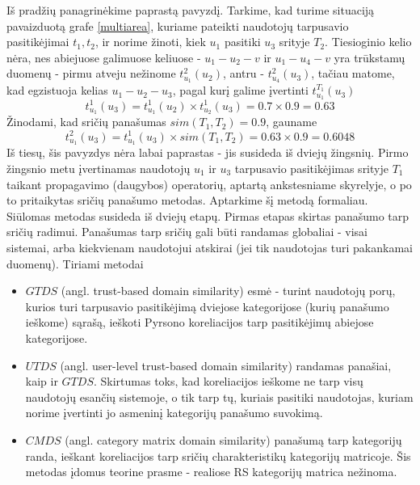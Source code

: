 \documentclass{VUMIFInfMagistrinis}
\begin{document}
\indent
Iš pradžių panagrinėkime paprastą pavyzdį. Tarkime, kad turime situaciją pavaizduotą grafe \ref{multiarea}, kuriame pateikti naudotojų tarpusavio pasitikėjimai ${t_1, t_2}$, ir norime žinoti, kiek $u_1$ pasitiki $u_3$ srityje $T_2$. Tiesioginio kelio nėra, nes abiejuose galimuose keliuose - $u_1 - u_2 - v$ ir $u_1 - u_4 - v$ yra trūkstamų duomenų - pirmu atveju nežinome $t_{u_1}^2(u_2)$, antru - $t_{u_4}^2(u_3)$, tačiau matome, kad egzistuoja kelias $u_1 - u_2 - u_3$, pagal kurį galime įvertinti $t_{u_1}^{T_1}(u_3)$
\begin{displaymath}
t_{u_1}^1(u_3)=t_{u_1}^1(u_2) \times t_{u_2}^1(u_3) = 0.7 \times 0.9 = 0.63
\end{displaymath}
Žinodami, kad sričių panašumas $sim(T_1, T_2) = 0.9$, gauname
\begin{displaymath}
t_{u_1}^2(u_3)=t_{u_1}^1(u_3) \times sim(T_1, T_2) = 0.63 \times 0.9 = 0.6048
\end{displaymath}
\indent 
Iš tiesų, šis pavyzdys nėra labai paprastas - jis susideda iš dviejų žingsnių. Pirmo žingsnio metu įvertinamas naudotojų $u_1$ ir $u_3$ tarpusavio pasitikėjimas srityje $T_1$ taikant propagavimo (daugybos) operatorių, aptartą ankstesniame skyrelyje, o po to pritaikytas sričių panašumo metodas. Aptarkime šį metodą formaliau.
\newline
\indent
Siūlomas metodas susideda iš dviejų etapų. Pirmas etapas skirtas panašumo tarp sričių radimui. Panašumas tarp sričių gali būti randamas globaliai - visai sistemai, arba kiekvienam naudotojui atskirai (jei tik naudotojas turi pakankamai duomenų). Tiriami metodai
\begin{itemize}
	\item $GTDS$ (angl. trust-based domain similarity) esmė - turint naudotojų porų, kurios turi tarpusavio pasitikėjimą dviejose kategorijose (kurių panašumo ieškome) sąrašą, ieškoti Pyrsono koreliacijos tarp pasitikėjimų abiejose kategorijose.
	\item $UTDS$ (angl. user-level trust-based domain similarity) randamas panašiai, kaip ir $GTDS$. Skirtumas toks, kad koreliacijos ieškome ne tarp visų naudotojų esančių sistemoje, o tik tarp tų, kuriais pasitiki naudotojas, kuriam norime įvertinti jo asmeninį kategorijų panašumo suvokimą.
	\item $CMDS$ (angl. category matrix domain similarity) panašumą tarp kategorijų randa, ieškant koreliacijos tarp sričių charakteristikų kategorijų matricoje. Šis metodas įdomus teorine prasme - realiose RS kategorijų matrica nežinoma.
\end{itemize}
\indent
\end{document}
